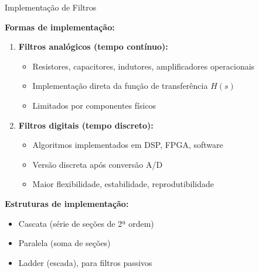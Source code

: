 \begin{frame}{Implementação de Filtros}

\textbf{Formas de implementação:}

\begin{enumerate}
\item \textbf{Filtros analógicos (tempo contínuo):}
   \begin{itemize}
   \item Resistores, capacitores, indutores, amplificadores operacionais
   \item Implementação direta da função de transferência $H(s)$
   \item Limitados por componentes físicos
   \end{itemize}

\item \textbf{Filtros digitais (tempo discreto):}
   \begin{itemize}
   \item Algoritmos implementados em DSP, FPGA, software
   \item Versão discreta após conversão A/D
   \item Maior flexibilidade, estabilidade, reprodutibilidade
   \end{itemize}
\end{enumerate}

\vspace{0.1cm}

\textbf{Estruturas de implementação:}

\begin{itemize}
\item Cascata (série de seções de 2ª ordem)
\item Paralela (soma de seções)
\item Ladder (escada), para filtros passivos
\end{itemize}

\end{frame}


